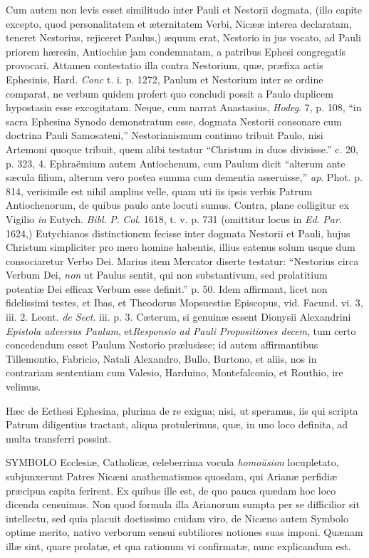 Cum autem non levis esset similitudo inter Pauli
et Nestorii dogmata, (illo capite excepto, quod personalitatem et æternitatem
Verbi, Nicææ interea declaratam, teneret Nestorius, rejiceret Paulus,)
æquum erat, Nestorio in jus vocato, ad Pauli priorem hæresin,
Antiochiæ jam condemnatam, a patribus Ephesi congregatis provocari.
Attamen contestatio illa contra Nestorium, quæ, præfixa actis
Ephesinis, Hard. \emph{Conc} t. i. p. 1272, Paulum et Nestorium inter
se ordine comparat, ne verbum quidem profert quo concludi possit a
Paulo duplicem hypostasin esse excogitatam. Neque, cum narrat
Anastasius, \emph{Hodeg}. 7, p. 108, ``in sacra Ephesina Synodo
demonstratum esse, dogmata Nestorii consonare cum doctrina Pauli
Samosateni,'' Nestorianismum continuo tribuit Paulo, nisi Artemoni
quoque tribuit, quem alibi testatur ``Christum in duos divisisse.'' c.
20, p. 323, 4. Ephraëmium autem Antiochenum, cum Paulum dicit ``alterum
ante sæcula filium, alterum vero postea summa cum dementia asseruisse,''
\emph{ap}. Phot. p. 814, verisimile est nihil amplius velle, quam uti
iis ipsis verbis Patrum Antiochenorum, de quibus paulo ante locuti
sumus. Contra, plane colligitur ex Vigilio \emph{in} Eutych. \emph{Bibl}.
\emph{P}. \emph{Col}. 1618, t. v. p. 731 (omittitur locus in \emph{Ed}.
\emph{Par}. 1624,) Eutychianos distinctionem fecisse inter dogmata
Nestorii et Pauli, hujus Christum simpliciter pro mero homine habentis,
illius eatenus solum usque dum consociaretur Verbo Dei. Marius item
Mercator diserte testatur: ``Nestorius circa Verbum Dei, \emph{non} ut
Paulus sentit, qui non substantivum, sed prolatitium potentiæ Dei
efficax Verbum esse definit.'' p. 50. Idem affirmant, licet non
fidelissimi testes, et Ibas, et Theodorus Mopsuestiæ Episcopus, vid.
Facund. vi. 3, iii. 2. Leont. \emph{de Sect}. iii. p. 3. Cæterum, si
genuinæ essent Dionysii Alexandrini \emph{Epistola adversus Paulum},
et\emph{Responsio ad Pauli Propositiones decem}, tum certo
concedendum esset Paulum Nestorio prælusisse; id autem affirmantibus
Tillemontio, Fabricio, Natali Alexandro, Bullo, Burtono, et aliis, nos
in contrariam sententiam cum Valesio, Harduino, Montefalconio, et
Routhio, ire velimus.

Hæc de Ecthesi Ephesina, plurima de re exigua;
nisi, ut speramus, iis qui scripta Patrum diligentius tractant, aliqua
protulerimus, quæ, in uno loco definita, ad multa transferri possint.


SYMBOLO
Ecclesiæ, Catholicæ, celeberrima vocula \emph{homoüsion} locupletato,
subjunxerunt Patres Nicæni anathematismos quosdam, qui Arianæ
perfidiæ præcipua capita ferirent. Ex quibus ille est, de quo pauca
quædam hoc loco dicenda censuimus. Non quod formula illa Arianorum
sumpta per se difficilior sit intellectu, sed quia placuit doctissimo
cuidam viro, de Nicæno autem Symbolo optime merito, nativo verborum
sensui subtiliores notiones suas imponi. Quænam illæ sint, quare
prolatæ, et qua rationum vi confirmatæ, nunc explicandum est.

